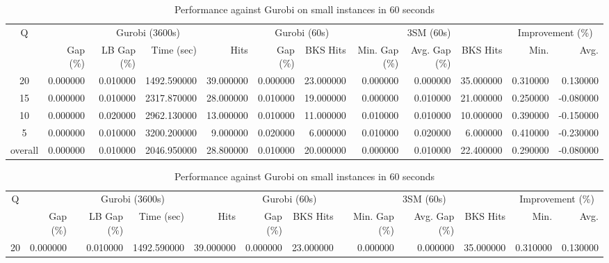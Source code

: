 \begin{table}[H]
\caption{Performance against Gurobi on small instances in 60 seconds}
\label{tab:3lm_resuts100T60}
\begin{tabular}{c rrrr rr rrr rr}
\toprule
Q & \multicolumn{4}{c}{Gurobi (3600s)} & \multicolumn{2}{c}{Gurobi (60s)} & \multicolumn{3}{c}{3SM (60s)} & \multicolumn{2}{c}{Improvement (\%)} \\
 & Gap (\%) & LB Gap (\%) & Time (sec) & Hits & Gap (\%) & BKS Hits & Min. Gap (\%) & Avg. Gap (\%) & BKS Hits & Min. & Avg. \\
\midrule
\cmidrule(lr){1-1} \cmidrule(lr){2-5} \cmidrule(lr){2-5} \cmidrule(lr){6-7} \cmidrule(lr){8-10} \cmidrule(lr){11-12}
20 & 0.000000 & 0.010000 & 1492.590000 & 39.000000 & 0.000000 & 23.000000 & 0.000000 & 0.000000 & 35.000000 & 0.310000 & 0.130000 \\
15 & 0.000000 & 0.010000 & 2317.870000 & 28.000000 & 0.010000 & 19.000000 & 0.000000 & 0.010000 & 21.000000 & 0.250000 & -0.080000 \\
10 & 0.000000 & 0.020000 & 2962.130000 & 13.000000 & 0.010000 & 11.000000 & 0.010000 & 0.010000 & 10.000000 & 0.390000 & -0.150000 \\
5 & 0.000000 & 0.010000 & 3200.200000 & 9.000000 & 0.020000 & 6.000000 & 0.010000 & 0.020000 & 6.000000 & 0.410000 & -0.230000 \\
\midrule
overall & 0.000000 & 0.010000 & 2046.950000 & 28.800000 & 0.010000 & 20.000000 & 0.000000 & 0.010000 & 22.400000 & 0.290000 & -0.080000 \\
\bottomrule
\end{tabular}
\end{table}\begin{table}[H]
\caption{Performance against Gurobi on small instances in 60 seconds}
\label{tab:3lm_resuts100T60}
\begin{tabular}{c rrrr rr rrr rr}
\toprule
Q & \multicolumn{4}{c}{Gurobi (3600s)} & \multicolumn{2}{c}{Gurobi (60s)} & \multicolumn{3}{c}{3SM (60s)} & \multicolumn{2}{c}{Improvement (\%)} \\
 & Gap (\%) & LB Gap (\%) & Time (sec) & Hits & Gap (\%) & BKS Hits & Min. Gap (\%) & Avg. Gap (\%) & BKS Hits & Min. & Avg. \\
\midrule
\cmidrule(lr){1-1} \cmidrule(lr){2-5} \cmidrule(lr){2-5} \cmidrule(lr){6-7} \cmidrule(lr){8-10} \cmidrule(lr){11-12}
20 & 0.000000 & 0.010000 & 1492.590000 & 39.000000 & 0.000000 & 23.000000 & 0.000000 & 0.000000 & 35.000000 & 0.310000 & 0.130000 \\

\end{tabular}
\end{table}

